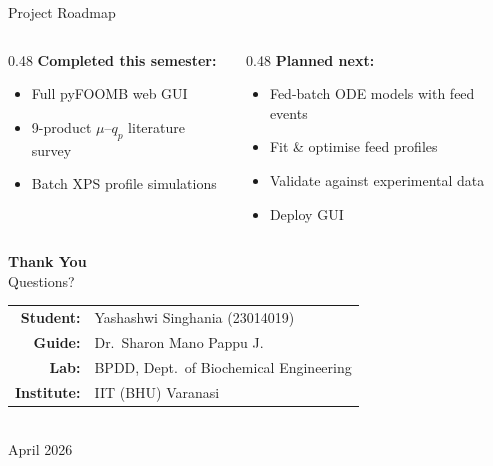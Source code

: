 \documentclass[aspectratio=169, 11pt]{beamer}
\begin{document}
\begin{frame}{Project Roadmap}
  \vspace{0.2cm}
  \begin{columns}[T]
    \begin{column}{0.48\textwidth}
      \textbf{Completed this semester:}
      {\small
      \begin{itemize}
        \item[\textcolor{donegreen}{\checkmark}] Full pyFOOMB web GUI
        \item[\textcolor{donegreen}{\checkmark}] 9-product $\mu$--$q_p$ literature survey
        \item[\textcolor{donegreen}{\checkmark}] Batch XPS profile simulations
      \end{itemize}
      }
    \end{column}
    \begin{column}{0.48\textwidth}
      \textbf{Planned next:}
      {\small
      \begin{itemize}
        \item[\textcolor{accentblue}{$\circ$}] Fed-batch ODE models with feed events
        \item[\textcolor{accentblue}{$\circ$}] Fit \& optimise feed profiles
        \item[\textcolor{accentblue}{$\circ$}] Validate against experimental data
        \item[\textcolor{accentblue}{$\circ$}] Deploy GUI
      \end{itemize}
      }
    \end{column}
  \end{columns}
\end{frame}

\begin{frame}[plain]
  \vfill
  \begin{center}
    {\LARGE\bfseries\color{darkcharcoal} Thank You}\\[0.6cm]
    {\large\color{accentblue} Questions?}\\[1cm]
    \begin{tabular}{rl}
      \textbf{Student:} & Yashashwi Singhania (23014019) \\
      \textbf{Guide:} & Dr.\ Sharon Mano Pappu J. \\
      \textbf{Lab:} & BPDD, Dept.\ of Biochemical Engineering \\
      \textbf{Institute:} & IIT (BHU) Varanasi \\
    \end{tabular}\\[0.8cm]
    {\small\color{darkcharcoal!60} April 2026}
  \end{center}
  \vfill
\end{frame}
\end{document}
